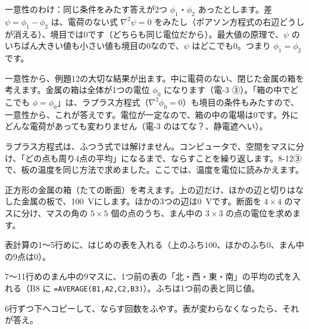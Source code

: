 \begin{seikaku}
一意性のわけ：同じ条件をみたす答えが2つ $\phi_1$・$\phi_2$ あったとします。差 $\psi=\phi_1-\phi_2$ は、電荷のない式 $\nabla^2\psi=0$ をみたし（ポアソン方程式の右辺どうしが消える）、境目では0です（どちらも同じ電位だから）。最大値の原理で、$\psi$ のいちばん大きい値も小さい値も境目の0なので、$\psi$ はどこでも0。つまり $\phi_1=\phi_2$ です。
\end{seikaku}

\noindent 一意性から、例題12の大切な結果が出ます。中に電荷のない、閉じた金属の箱を考えます。金属の箱は全体が1つの電位 $\phi_0$ になります（電-3 ③）。「箱の中でどこでも $\phi=\phi_0$」は、ラプラス方程式（$\nabla^2\phi_0=0$）も境目の条件もみたすので、一意性から、これが答えです。電位が一定なので、箱の中の電場は0です。外にどんな電荷があっても変わりません（電-3 のはてな？、静電遮へい）。

\label{ph:電-2:sec11}
ラプラス方程式は、ふつう式では解けません。コンピュータで、空間をマスに分け、「どの点も周り4点の平均」になるまで、ならすことを繰り返します。8-12③で、板の温度を同じ方法で求めました。ここでは、温度を電位に読みかえます。

正方形の金属の箱（たての断面）を考えます。上の辺だけ、ほかの辺と切りはなした金属の板で、\qty{100}{V}にします。ほかの3つの辺は\qty{0}{V}です。断面を $4\times4$ のマスに分け、マスの角の $5\times5$ 個の点のうち、まん中の $3\times3$ の点の電位を求めます。
\begin{enumerate}[label={\bkcircled[bkGreen]{\arabic*}}, leftmargin=2.4\zw, itemsep=1pt, topsep=2pt]
\item 表計算の1〜5行めに、はじめの表を入れる（上のふち100、ほかのふち0、まん中の9点は0）。
\item 7〜11行めのまん中の9マスに、1つ前の表の「北・西・東・南」の平均の式を入れる（B8 に \texttt{=AVERAGE(B1,A2,C2,B3)}）。ふちは1つ前の表と同じ値。
\item 6行ずつ下へコピーして、ならす回数をふやす。表が変わらなくなったら、それが答え。
\end{enumerate}

\begin{bkcenter}
\label{ph:電-2:tab-sheet}
\end{bkcenter}

